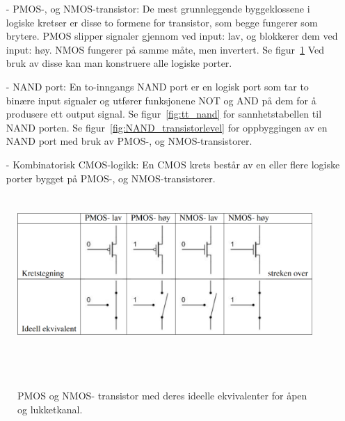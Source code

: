     \begin{itemize}
        \item[-] PMOS-, og NMOS-transistor: De mest grunnleggende byggeklossene i logiske kretser er disse to formene for transistor, som begge fungerer som brytere.
        PMOS slipper signaler gjennom ved input: lav, og blokkerer dem ved input: høy.
        NMOS fungerer på samme måte, men invertert.
        Se figur~\ref{fig:pnmos_transistors} Ved bruk av disse kan man konstruere alle logiske porter.
        \item[-] NAND port: En to-inngangs NAND port er en logisk port som tar to binære input signaler og utfører funksjonene NOT og AND på dem for å produsere ett output signal.
        Se figur~\ref{fig:tt_nand} for sannhetstabellen til NAND porten.
        Se figur~\ref{fig:NAND_transistorlevel} for oppbyggingen av en NAND port med bruk av PMOS-, og NMOS-transistorer.
        \item[-] Kombinatorisk CMOS-logikk: En CMOS krets består av en eller flere logiske porter bygget på PMOS-, og NMOS-transistorer.
    \end{itemize}

    \begin{figure}[!t]
        \centering
        \includegraphics[height=6cm]{figurer/PNMOS.png}
        \caption{PMOS og NMOS- transistor med deres ideelle ekvivalenter for åpen og lukketkanal.}
        \label{fig:pnmos_transistors}
        ~\cite{Labhefte}
    \end{figure}

